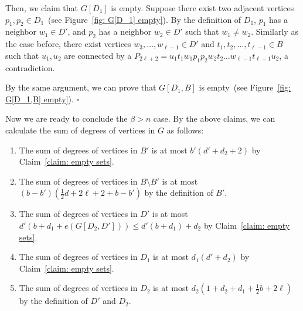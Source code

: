 \documentclass[12pt]{article}%
\newenvironment{proof}{{\noindent\it Proof.}}{\hfill $\square$\par}
\begin{document}
\begin{proof}
	Then, we claim that $G[D_1]$ is empty.
	Suppose  there exist two adjacent vertices $p_1,p_2 \in D_1$~(see Figure~\ref{fig: G[D_1] empty}).
	By the definition of $D_1$, $p_1$ has a neighbor $w_1 \in D'$, and $p_2$ has a neighbor $w_2 \in D'$ such that $w_1 \neq w_2$.
	Similarly as the case before, there exist vertices $w_3,\ldots,w_{\ell-1} \in D'$ and $t_1,t_2,\ldots,t_{\ell-1} \in B$ such that $u_1,u_2$ are connected by a $P_{2\ell+2}=u_1t_1w_1p_1p_2w_2t_2\ldots w_{\ell-1}t_{\ell-1}u_2$, a contradiction.

	By the same argument, we can prove that $G[D_1,B]$ is empty~(see Figure~\ref{fig: G[D_1,B] empty}).
\end{proof}



Now we are ready to conclude the $\beta > n$ case.
By the above claims, we can calculate the sum of degrees of vertices in $G$ as follows:
\begin{enumerate}
	\item The sum of degrees of vertices in $B'$ is at most $b'(d' + d_2+2)$ by Claim~\ref{claim: empty sets}.
	\item The sum of degrees of vertices in $B\setminus B'$ is at most $(b-b')(\frac{1}{2}d + 2\ell + 2 + b-b')$ by the definition of $B'$.
	\item The sum of degrees of vertices in $D'$ is at most $d'(b + d_1 + e(G[D_2, D'])) \le d'(b+d_1) + d_2$ by Claim~\ref{claim: empty sets}.
	\item The sum of degrees of vertices in $D_1$ is at most $d_1(d' + d_2)$ by Claim~\ref{claim: empty sets}.
	\item The sum of degrees of vertices in $D_2$ is at most $d_2(1 +d_2 + d_1 + \frac{1}{2}b +2\ell)$ by the definition of $D'$ and $D_2$.
\end{enumerate}
\end{document}
